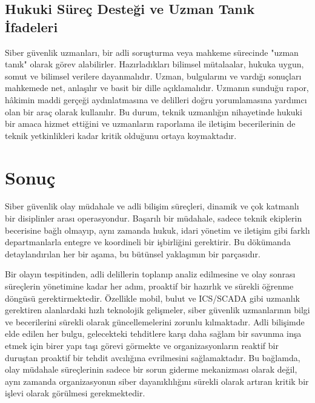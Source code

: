\subsection{Hukuki Süreç Desteği ve Uzman Tanık İfadeleri}

Siber güvenlik uzmanları, bir adli soruşturma veya mahkeme sürecinde "uzman tanık" olarak görev alabilirler. Hazırladıkları bilimsel mütalaalar, hukuka uygun, somut ve bilimsel verilere dayanmalıdır. Uzman, bulgularını ve vardığı sonuçları mahkemede net, anlaşılır ve basit bir dille açıklamalıdır. Uzmanın sunduğu rapor, hâkimin maddi gerçeği aydınlatmasına ve delilleri doğru yorumlamasına yardımcı olan bir araç olarak kullanılır. Bu durum, teknik uzmanlığın nihayetinde hukuki bir amaca hizmet ettiğini ve uzmanların raporlama ile iletişim becerilerinin de teknik yetkinlikleri kadar kritik olduğunu ortaya koymaktadır.

\section{Sonuç}

Siber güvenlik olay müdahale ve adli bilişim süreçleri, dinamik ve çok katmanlı bir disiplinler arası operasyondur. Başarılı bir müdahale, sadece teknik ekiplerin becerisine bağlı olmayıp, aynı zamanda hukuk, idari yönetim ve iletişim gibi farklı departmanlarla entegre ve koordineli bir işbirliğini gerektirir. Bu dökümanda detaylandırılan her bir aşama, bu bütünsel yaklaşımın bir parçasıdır.

Bir olayın tespitinden, adli delillerin toplanıp analiz edilmesine ve olay sonrası süreçlerin yönetimine kadar her adım, proaktif bir hazırlık ve sürekli öğrenme döngüsü gerektirmektedir. Özellikle mobil, bulut ve ICS/SCADA gibi uzmanlık gerektiren alanlardaki hızlı teknolojik gelişmeler, siber güvenlik uzmanlarının bilgi ve becerilerini sürekli olarak güncellemelerini zorunlu kılmaktadır. Adli bilişimde elde edilen her bulgu, gelecekteki tehditlere karşı daha sağlam bir savunma inşa etmek için birer yapı taşı görevi görmekte ve organizasyonların reaktif bir duruştan proaktif bir tehdit avcılığına evrilmesini sağlamaktadır. Bu bağlamda, olay müdahale süreçlerinin sadece bir sorun giderme mekanizması olarak değil, aynı zamanda organizasyonun siber dayanıklılığını sürekli olarak artıran kritik bir işlevi olarak görülmesi gerekmektedir.